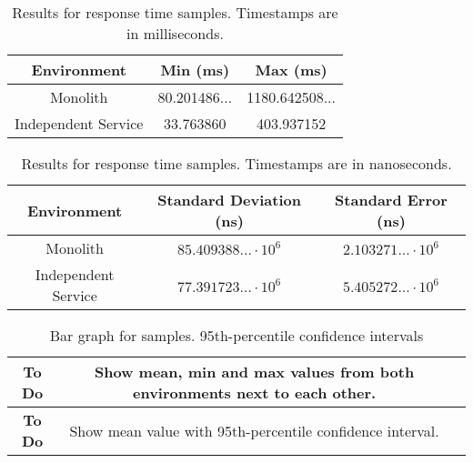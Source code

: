\begin{table}[ht!]
    \begin{tabular}{|c|c|c|} 
        \hline
        Environment
        & Min (ms)
        & Max (ms) \\ [0.5ex] 
        
        \hline\hline
        Monolith
        & 80.201486... 
        & 1180.642508...
        \\ 
        
        Independent Service
        & 33.763860
        & 403.937152
        \\
        \hline
    \end{tabular}
    \caption{Results for response time samples. Timestamps are in milliseconds.}
    \label{table:response time results:2}
\end{table}

\begin{table}[ht!]
    \begin{tabular}{|c|c|c|} 
        \hline
        Environment
        & Standard Deviation (ns)
        & Standard Error (ns) \\ [0.5ex] 
        
        \hline\hline
        Monolith
        & $85.409388... \cdot 10^6$
        & $2.103271... \cdot 10^6$
        \\ 
        
        Independent Service
        & $77.391723... \cdot 10^6$
        & $5.405272... \cdot 10^6$
        \\ 
         \hline
    \end{tabular}
    \caption{Results for response time samples. Timestamps are in nanoseconds.}
    \label{table:response time results:3}
\end{table}

\begin{table}[ht!]
    \begin{tabular}{|c|c|c|} 
        \hline
        \textbf{To Do}
        & Show mean, min and max values from both environments next to each other.
        \\
        \hline
        \textbf{To Do}
        & Show mean value with 95th-percentile confidence interval.
        \\ [0.5ex] 
        \hline
    \end{tabular}
    \caption{Bar graph for samples. 95th-percentile confidence intervals}
    \label{grap:response time results:bar-95th}
\end{table}


